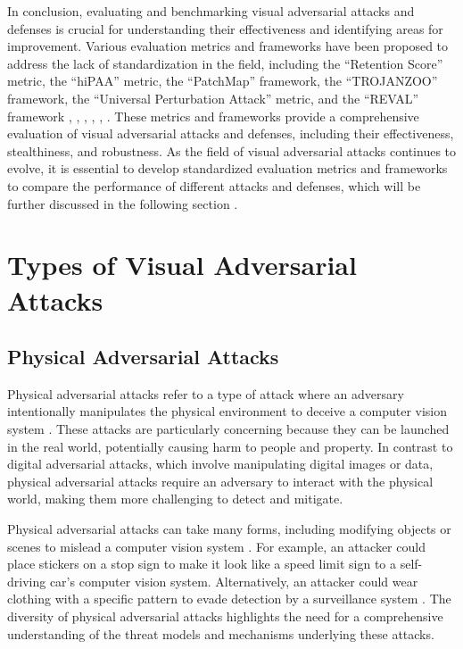 \documentclass[11pt]{article}
\begin{document}
In conclusion, evaluating and benchmarking visual adversarial attacks and defenses is crucial for understanding their effectiveness and identifying areas for improvement. Various evaluation metrics and frameworks have been proposed to address the lack of standardization in the field, including the ``Retention Score'' metric, the ``hiPAA'' metric, the ``PatchMap'' framework, the ``TROJANZOO'' framework, the ``Universal Perturbation Attack'' metric, and the ``REVAL'' framework \cite{ref28}, \cite{ref3}, \cite{ref29}, \cite{ref30}, \cite{ref31}, \cite{ref32}. These metrics and frameworks provide a comprehensive evaluation of visual adversarial attacks and defenses, including their effectiveness, stealthiness, and robustness. As the field of visual adversarial attacks continues to evolve, it is essential to develop standardized evaluation metrics and frameworks to compare the performance of different attacks and defenses, which will be further discussed in the following section \cite{ref8}.

\section{Types of Visual Adversarial Attacks}

\subsection{Physical Adversarial Attacks}

Physical adversarial attacks refer to a type of attack where an adversary intentionally manipulates the physical environment to deceive a computer vision system \cite{ref3}. These attacks are particularly concerning because they can be launched in the real world, potentially causing harm to people and property. In contrast to digital adversarial attacks, which involve manipulating digital images or data, physical adversarial attacks require an adversary to interact with the physical world, making them more challenging to detect and mitigate.

Physical adversarial attacks can take many forms, including modifying objects or scenes to mislead a computer vision system \cite{ref2}. For example, an attacker could place stickers on a stop sign to make it look like a speed limit sign to a self-driving car's computer vision system. Alternatively, an attacker could wear clothing with a specific pattern to evade detection by a surveillance system \cite{ref34}. The diversity of physical adversarial attacks highlights the need for a comprehensive understanding of the threat models and mechanisms underlying these attacks.
\end{document}
